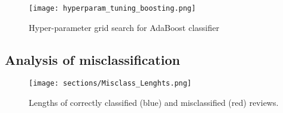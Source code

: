 \begin{figure}
    \centering
    \texttt{[image: hyperparam\_tuning\_boosting.png]}
    \caption{Hyper-parameter grid search for AdaBoost classifier}
    \label{fig:BoostTuning}
\end{figure}

\subsection{Analysis of misclassification}


\begin{figure}
    \centering
    \texttt{[image: sections/Misclass\_Lenghts.png]}
    \caption{Lengths of correctly classified (blue) and misclassified (red) reviews.}
    \label{fig:MisclassLengths}
\end{figure}